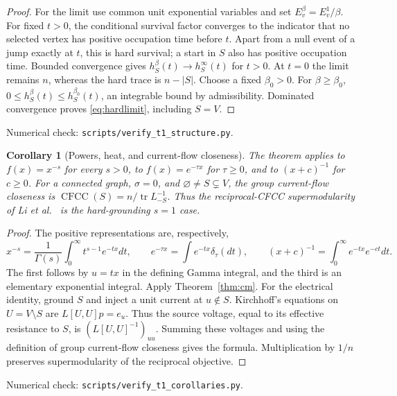 \documentclass[11pt]{article}
\newtheorem{corollary}[theorem]{Corollary}
\DeclareMathOperator{\tr}{tr}
\begin{document}
\begin{proof}
For the limit use common unit exponential variables and set
$E_v^{\beta}=E_v^1/\beta$. For fixed $t>0$, the conditional survival
factor converges to the indicator that no selected vertex has positive
occupation time before $t$. Apart from a null event of a jump exactly
at $t$, this is hard survival; a start in $S$ also has positive
occupation time. Bounded convergence gives
$h_S^\beta(t)\to h_S^\infty(t)$ for $t>0$.
At $t=0$ the limit remains $n$, whereas the hard trace is $n-|S|$.
Choose a fixed $\beta_0>0$. For $\beta\geq\beta_0$,
$0\leq h_S^\beta(t)\leq h_S^{\beta_0}(t)$, an integrable bound by
admissibility. Dominated convergence proves \eqref{eq:hardlimit},
including $S=V$.
\end{proof}
\noindent Numerical check: \texttt{scripts/verify\_t1\_structure.py}.

\begin{corollary}[Powers, heat, and current-flow closeness]\label{cor:instances}
The theorem applies to $f(x)=x^{-s}$ for every $s>0$, to
$f(x)=e^{-\tau x}$ for $\tau\geq0$, and to $(x+c)^{-1}$ for $c\geq0$.
For a connected graph, $\sigma=0$, and $\varnothing\ne S\subsetneq V$,
the group current-flow closeness is
$\operatorname{CFCC}(S)=n/\tr L_{-S}^{-1}$.
Thus the reciprocal-CFCC supermodularity of Li et al.~\cite{li2019}
is the hard-grounding $s=1$ case.
\end{corollary}
\begin{proof}
The positive representations are, respectively,
\[
 x^{-s}=\frac1{\Gamma(s)}\int_0^\infty t^{s-1}e^{-tx}dt,
 \qquad e^{-\tau x}=\int e^{-tx}\delta_\tau(dt),
 \qquad (x+c)^{-1}=\int_0^\infty e^{-tx}e^{-ct}dt.
\]
The first follows by $u=tx$ in the defining Gamma integral, and the
third is an elementary exponential integral. Apply Theorem~\ref{thm:cm}.
For the electrical identity, ground $S$ and inject a unit current at
$u\notin S$. Kirchhoff's equations on $U=V\setminus S$ are
$L[U,U]p=e_u$. Thus the source voltage, equal to its effective
resistance to $S$, is $(L[U,U]^{-1})_{uu}$. Summing these voltages
and using the definition of group current-flow closeness gives the
formula. Multiplication by $1/n$ preserves supermodularity of the
reciprocal objective.
\end{proof}
\noindent Numerical check: \texttt{scripts/verify\_t1\_corollaries.py}.
\end{document}
